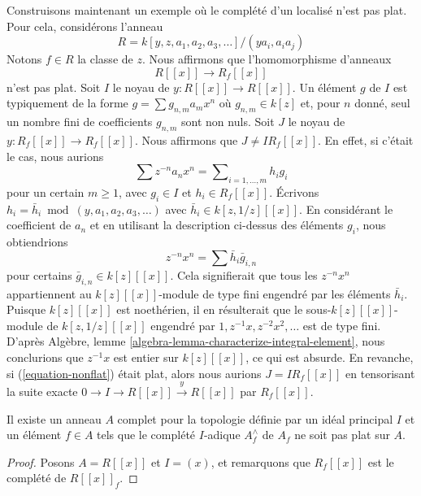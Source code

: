 \noindent
Construisons maintenant un exemple où le complété d'un localisé
n'est pas plat. Pour cela, considérons l'anneau
$$
R = k[y, z, a_1, a_2, a_3, \ldots]/(ya_i, a_i a_j)
$$
Notons $f \in R$ la classe de $z$. Nous affirmons que l'homomorphisme d'anneaux
\begin{equation}
\label{equation-nonflat}
R[[x]] \longrightarrow R_f[[x]]
\end{equation}
n'est pas plat. Soit $I$ le noyau de $y : R[[x]] \to R[[x]]$. Un
élément $g$ de $I$ est typiquement de la forme $g = \sum g_{n, m} a_mx^n$
où $g_{n, m} \in k[z]$ et, pour $n$ donné, seul un nombre fini de
coefficients $g_{n, m}$ sont non nuls. Soit $J$ le noyau de $y : R_f[[x]] \to R_f[[x]]$.
Nous affirmons que $J \not = I R_f[[x]]$. En effet, si c'était le cas, nous
aurions
$$
\sum z^{-n} a_n x^n = \sum\nolimits_{i = 1, \ldots, m} h_i g_i
$$
pour un certain $m \geq 1$, avec $g_i \in I$ et $h_i \in R_f[[x]]$. Écrivons
$h_i = \bar h_i \bmod (y, a_1, a_2, a_3, \ldots)$
avec $\bar h_i \in k[z, 1/z][[x]]$. En considérant le coefficient de
$a_n$ et en utilisant la description ci-dessus des éléments $g_i$, nous obtiendrions
$$
z^{-n} x^n = \sum \bar h_i \bar g_{i, n}
$$
pour certains $\bar g_{i, n} \in k[z][[x]]$. Cela signifierait que
tous les $z^{-n}x^n$ appartiennent au $k[z][[x]]$-module de type fini
engendré par les éléments $\bar h_i$. Puisque $k[z][[x]]$ est noethérien,
il en résulterait que le sous-$k[z][[x]]$-module de $k[z, 1/z][[x]]$
engendré par $1, z^{-1}x, z^{-2}x^2, \ldots$ est de type fini. D'après
Algèbre, lemme \ref{algebra-lemma-characterize-integral-element},
nous conclurions que $z^{-1}x$ est entier sur $k[z][[x]]$,
ce qui est absurde. En revanche,
si (\ref{equation-nonflat}) était plat, alors nous
aurions $J = IR_f[[x]]$ en tensorisant la suite exacte
$0 \to I \to R[[x]] \xrightarrow{y} R[[x]]$ par $R_f[[x]]$.

\begin{lemma}
\label{lemma-nonflat-completion-localization}
Il existe un anneau $A$ complet pour la topologie définie par un idéal principal $I$
et un élément $f \in A$ tels que le complété $I$-adique
$A_f^\wedge$ de $A_f$ ne soit pas plat sur $A$.
\end{lemma}

\begin{proof}
Posons $A = R[[x]]$ et $I = (x)$, et remarquons que $R_f[[x]]$
est le complété de $R[[x]]_f$.
\end{proof}





